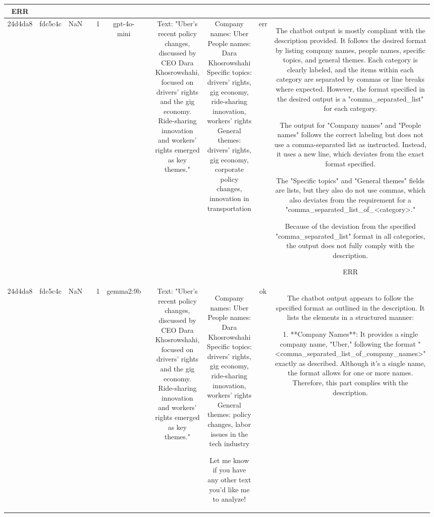 \begin{table}[h!]
\begin{tabular}{|c|c|c|c|c|c|c|c|c|c|c|}
ERR\\
\hline
24d4da8 & fdc5c4c & NaN &  & 1 & gpt-4o-mini &  & Text: "Uber's recent policy changes, discussed by CEO Dara Khosrowshahi, focused on drivers' rights and the gig economy. Ride-sharing innovation and workers' rights emerged as key themes." & Company names: Uber  
People names: Dara Khosrowshahi  
Specific topics: drivers' rights, gig economy, ride-sharing innovation, workers' rights  
General themes: drivers' rights, gig economy, corporate policy changes, innovation in transportation & err & The chatbot output is mostly compliant with the description provided. It follows the desired format by listing company names, people names, specific topics, and general themes. Each category is clearly labeled, and the items within each category are separated by commas or line breaks where expected. However, the format specified in the desired output is a "comma_separated_list" for each category.

The output for "Company names" and "People names" follows the correct labeling but does not use a comma-separated list as instructed. Instead, it uses a new line, which deviates from the exact format specified.

The "Specific topics" and "General themes" fields are lists, but they also do not use commas, which also deviates from the requirement for a "comma_separated_list_of_<category>."

Because of the deviation from the specified "comma_separated_list" format in all categories, the output does not fully comply with the description.

ERR\\
\hline
24d4da8 & fdc5c4c & NaN &  & 1 & gemma2:9b &  & Text: "Uber's recent policy changes, discussed by CEO Dara Khosrowshahi, focused on drivers' rights and the gig economy. Ride-sharing innovation and workers' rights emerged as key themes." & Company names: Uber 
People names: Dara Khosrowshahi
Specific topics: drivers' rights, gig economy, ride-sharing innovation, workers' rights
General themes:  policy changes, labor issues in the tech industry 


Let me know if you have any other text you'd like me to analyze! & ok & The chatbot output appears to follow the specified format as outlined in the description. It lists the elements in a structured manner: 

1. **Company Names**: It provides a single company name, "Uber," following the format "<comma_separated_list_of_company_names>" exactly as described. Although it's a single name, the format allows for one or more names. Therefore, this part complies with the description.


\end{tabular}
\end{table}
